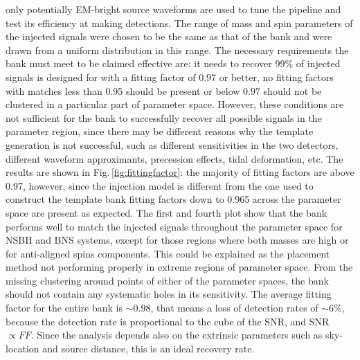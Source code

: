 \documentclass[binding=0.6cm, LaM]{sapthesis}
\begin{document}
	only potentially EM-bright source waveforms are used to tune the pipeline and test its efficiency at making detections.
	The range of mass and spin parameters of the injected signals were chosen 
	to be the same as that of the bank and were drawn from a uniform distribution in this range. 
	The necessary requirements the bank must meet to be claimed effective are: 
	it needs to recover 99\% of injected signals is designed for with a fitting factor of 0.97 or better,
	no fitting factors with matches less than 0.95 should be present or 
	below 0.97 should not be clustered in a particular part of parameter space. 
	However, these conditions are not sufficient for the bank to  successfully recover all possible signals in the parameter region,
	since there may be different reasons why the template generation is not successful, such as different sensitivities in the two detectors, 	
	different waveform approximants, precession effects, tidal deformation, etc.
	The results are shown in Fig.\,\ref{fig:fittingfactor}: 
	the majority of fitting factors are above 0.97, 
	however, since the injection model is different from the one used to construct the template bank
	fitting factors down to 0.965 across the parameter space are present as expected.
	The first and fourth plot show that the bank performs well to match the injected signals 
	throughout the parameter space for NSBH and BNS systems, 
	except for those regions where both masses are high or for anti-aligned spins components.
	This could be explained as the placement method not performing properly in extreme regions of parameter space.
	From the missing clustering around points of either of the parameter spaces,
	the bank should not contain any systematic holes in its sensitivity.
	The average fitting factor for the entire bank is $\sim0.98$, that means a loss of detection rates of $\sim6\%$,
	because the detection rate  is proportional to the cube of the SNR, and SNR $\propto FF$.
	Since the analysis depends also on the extrinsic parameters such as sky-location and source distance,
	this is an ideal recovery rate.
\end{document}
